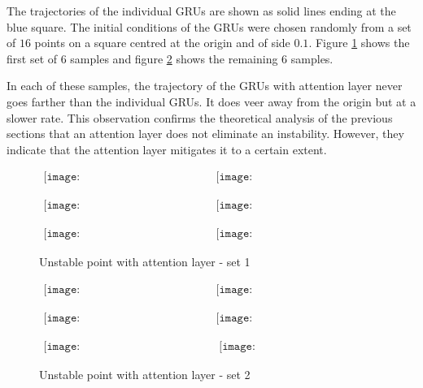 \documentclass{article}
\numberwithin{equation}{section}
\begin{document}
The trajectories of the
individual GRUs are shown as solid lines ending at the blue square. The
initial conditions of the GRUs were chosen randomly from a set of $16$ points
on a square centred at the origin and of side $0.1$. Figure \ref{f3} shows
the first set of $6$ samples and figure \ref{f4} shows the remaining $6$
samples.

In each of these samples, the trajectory of the GRUs with attention layer
never goes farther than the individual GRUs. It does veer away from the 
origin but at a slower rate. This observation confirms the theoretical analysis
of the previous sections that an attention layer does not eliminate an 
instability. However, they indicate that the attention layer mitigates it to
a certain extent.

\begin{figure}[!htbp]
\caption{Unstable point with attention layer - set 1}\label{f3}
\begin{center}$
\begin{array}{cc}
\texttt{[image: Ex1\_Unstable\_Point\_Sample\_0]}&
\texttt{[image: Ex1\_Unstable\_Point\_Sample\_1]}
\end{array}$
\end{center}
\begin{center}$
\begin{array}{cc}
\texttt{[image: Ex1\_Unstable\_Point\_Sample\_2]}&
\texttt{[image: Ex1\_Unstable\_Point\_Sample\_3]}
\end{array}$
\end{center}
\begin{center}$
\begin{array}{cc}
\texttt{[image: Ex1\_Unstable\_Point\_Sample\_4]}&
\texttt{[image: Ex1\_Unstable\_Point\_Sample\_5]}
\end{array}$
\end{center}
\end{figure}

\begin{figure}[!htbp]
\caption{Unstable point with attention layer - set 2}\label{f4}
\begin{center}$
\begin{array}{cc}
\texttt{[image: Ex1\_Unstable\_Point\_Sample\_6]}&
\texttt{[image: Ex1\_Unstable\_Point\_Sample\_7]}
\end{array}$
\end{center}
\begin{center}$
\begin{array}{cc}
\texttt{[image: Ex1\_Unstable\_Point\_Sample\_8]}&
\texttt{[image: Ex1\_Unstable\_Point\_Sample\_9]}
\end{array}$
\end{center}
\begin{center}$
\begin{array}{cc}
\texttt{[image: Ex1\_Unstable\_Point\_Sample\_10]}&
\texttt{[image: Ex1\_Unstable\_Point\_Sample\_9]}
\end{array}$
\end{center}
\end{figure}
\end{document}
